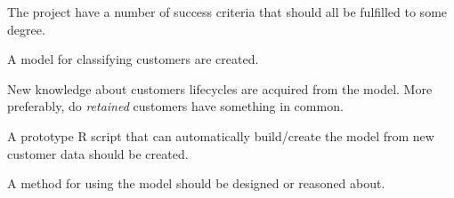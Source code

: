 The project have a number of success criteria that should all be fulfilled to
some degree.

\begin{enumerate*}
  \item A model for classifying customers are created.
  \item New knowledge about customers lifecycles are acquired from the model.
        More preferably, do \textit{retained} customers have something in common.
  \item A prototype R script that can automatically build/create the model from
  		  new customer data should be created.
  \item A method for using the model should be designed or reasoned about.
\end{enumerate*}
